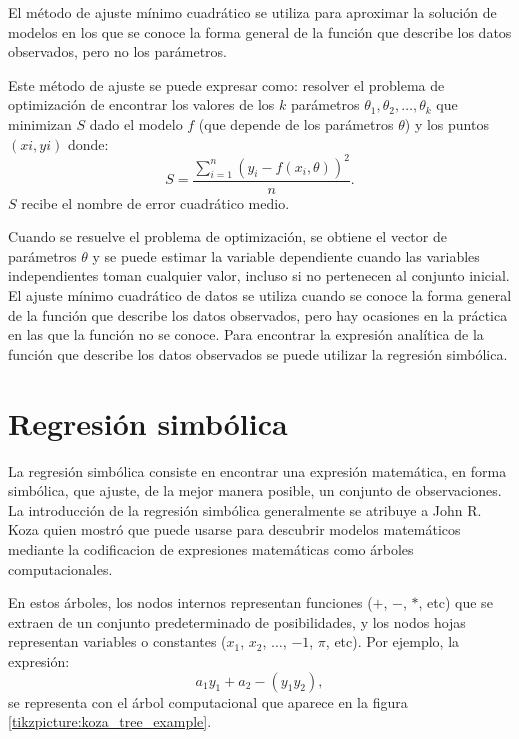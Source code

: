 El método de ajuste mínimo cuadrático se utiliza para aproximar la solución de modelos en los que se conoce la forma general de la función que describe los datos observados, pero no los parámetros.

Este método de ajuste se puede expresar como: resolver el problema de optimización de encontrar los valores de los $k$ parámetros $\theta_1, \theta_2, \dots, \theta_k$ que minimizan $S$ dado el modelo $f$ (que depende de los parámetros $\theta$) y los puntos $(xi, yi)$ donde:
$$S = \frac{\sum_{i=1}^{n}(y_i - f(x_i, \theta))^2}{n}.$$
$S$ recibe el nombre de error cuadrático medio.

Cuando se resuelve el problema de optimización, se obtiene el vector de parámetros $\theta$ y se puede estimar la variable dependiente cuando las variables independientes toman cualquier valor, incluso si no pertenecen al conjunto inicial. El ajuste mínimo cuadrático de datos se utiliza cuando se conoce la forma general de la función que describe los datos observados, pero hay ocasiones en la práctica en las que la función no se conoce. Para encontrar la expresión analítica de la función que describe los datos observados se puede utilizar la regresión simbólica.

\section{Regresión simbólica}\label{section:symbolic_regression}

La regresión simbólica consiste en encontrar una expresión matemática, en forma simbólica, que ajuste, de la mejor manera posible, un conjunto de observaciones. La introducción de la regresión simbólica generalmente se atribuye a John R. Koza \cite{zelinka2005analytic} quien mostró que puede usarse para descubrir modelos matemáticos mediante la codificacion de expresiones matemáticas como árboles computacionales.

En estos árboles, los nodos internos representan funciones ($+$, $-$, $*$, etc) que se extraen de un conjunto predeterminado de posibilidades, y los nodos hojas representan variables o constantes ($x_1$, $x_2$, $\dots$, $-1$, $\pi$, etc). Por ejemplo, la expresión:
$$a_1 y_1 + a_2 -(y_1 y_2),$$
se representa con el árbol computacional que aparece en la figura \ref{tikzpicture:koza_tree_example}.

